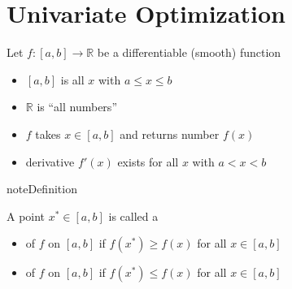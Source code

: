 \documentclass[letterpaper,10pt,english]{jupyterBook}
\begin{document}
\section{Univariate Optimization}
\label{\detokenize{02.optimization_intro:univariate-optimization}}
\sphinxAtStartPar
Let \(f \colon [a, b] \to \mathbb{R}\) be a differentiable (smooth) function
\begin{itemize}
\item {} 
\sphinxAtStartPar
\([a, b]\) is all \(x\) with \(a \leq x \leq b\)

\item {} 
\sphinxAtStartPar
\(\mathbb{R}\) is “all numbers”

\item {} 
\sphinxAtStartPar
\(f\) takes \(x \in [a, b]\) and returns number \(f(x)\)

\item {} 
\sphinxAtStartPar
derivative \(f'(x)\) exists for all \(x\) with \(a < x < b\)

\end{itemize}

\begin{sphinxadmonition}{note}{Definition}

\sphinxAtStartPar
A  point \(x^* \in [a, b]\) is called a
\begin{itemize}
\item {} 
\sphinxAtStartPar
{} of \(f\) on \([a, b]\) if \(f(x^*) \geq f(x)\) for all \(x \in [a,b]\)

\item {} 
\sphinxAtStartPar
{} of \(f\) on \([a, b]\) if \(f(x^*) \leq f(x)\) for all \(x \in [a,b]\)

\end{itemize}
\end{sphinxadmonition}
\end{document}
